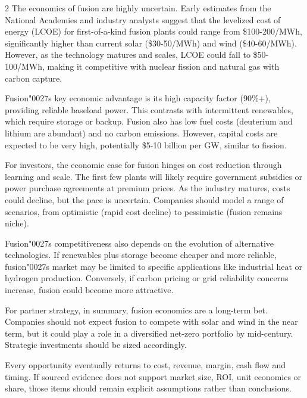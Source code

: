 \documentclass[10pt,a4paper]{article}
\newcommand{\BOApos}{{\BOQuoteFont\char"0027}}
\begin{document}
\begin{multicols}{2}
{\small The economics of fusion are highly uncertain. Early estimates from the National Academies and industry analysts suggest that the levelized cost of energy (LCOE) for first-of-a-kind fusion plants could range from \$100-200/MWh, significantly higher than current solar (\$30-50/MWh) and wind (\$40-60/MWh). However, as the technology matures and scales, LCOE could fall to \$50-100/MWh, making it competitive with nuclear fission and natural gas with carbon capture.}\par
{\small Fusion\BOApos{}s key economic advantage is its high capacity factor (90\%+), providing reliable baseload power. This contrasts with intermittent renewables, which require storage or backup. Fusion also has low fuel costs (deuterium and lithium are abundant) and no carbon emissions. However, capital costs are expected to be very high, potentially \$5-10 billion per GW, similar to fission.}\par
{\small For investors, the economic case for fusion hinges on cost reduction through learning and scale. The first few plants will likely require government subsidies or power purchase agreements at premium prices. As the industry matures, costs could decline, but the pace is uncertain. Companies should model a range of scenarios, from optimistic (rapid cost decline) to pessimistic (fusion remains niche).}\par
{\small Fusion\BOApos{}s competitiveness also depends on the evolution of alternative technologies. If renewables plus storage become cheaper and more reliable, fusion\BOApos{}s market may be limited to specific applications like industrial heat or hydrogen production. Conversely, if carbon pricing or grid reliability concerns increase, fusion could become more attractive.}\par
{\small For partner strategy, in summary, fusion economics are a long-term bet. Companies should not expect fusion to compete with solar and wind in the near term, but it could play a role in a diversified net-zero portfolio by mid-century. Strategic investments should be sized accordingly.}\par
{\small Every opportunity eventually returns to cost, revenue, margin, cash flow and timing. If sourced evidence does not support market size, ROI, unit economics or share, those items should remain explicit assumptions rather than conclusions.}\par
\end{multicols}
\label{chap:3:end}
\end{document}
